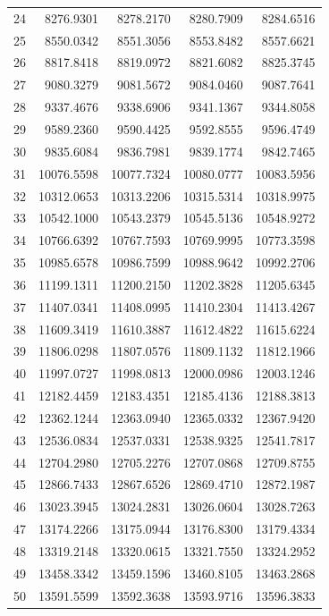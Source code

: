 \documentclass[11pt]{article}
\begin{document}
\begin{longtable}{r r r r r }
24 & 8276.9301 & 8278.2170 & 8280.7909 & 8284.6516 \\
25 & 8550.0342 & 8551.3056 & 8553.8482 & 8557.6621 \\
26 & 8817.8418 & 8819.0972 & 8821.6082 & 8825.3745 \\
27 & 9080.3279 & 9081.5672 & 9084.0460 & 9087.7641 \\
28 & 9337.4676 & 9338.6906 & 9341.1367 & 9344.8058 \\
29 & 9589.2360 & 9590.4425 & 9592.8555 & 9596.4749 \\
30 & 9835.6084 & 9836.7981 & 9839.1774 & 9842.7465 \\
31 & 10076.5598 & 10077.7324 & 10080.0777 & 10083.5956 \\
32 & 10312.0653 & 10313.2206 & 10315.5314 & 10318.9975 \\
33 & 10542.1000 & 10543.2379 & 10545.5136 & 10548.9272 \\
34 & 10766.6392 & 10767.7593 & 10769.9995 & 10773.3598 \\
35 & 10985.6578 & 10986.7599 & 10988.9642 & 10992.2706 \\
36 & 11199.1311 & 11200.2150 & 11202.3828 & 11205.6345 \\
37 & 11407.0341 & 11408.0995 & 11410.2304 & 11413.4267 \\
38 & 11609.3419 & 11610.3887 & 11612.4822 & 11615.6224 \\
39 & 11806.0298 & 11807.0576 & 11809.1132 & 11812.1966 \\
40 & 11997.0727 & 11998.0813 & 12000.0986 & 12003.1246 \\
41 & 12182.4459 & 12183.4351 & 12185.4136 & 12188.3813 \\
42 & 12362.1244 & 12363.0940 & 12365.0332 & 12367.9420 \\
43 & 12536.0834 & 12537.0331 & 12538.9325 & 12541.7817 \\
44 & 12704.2980 & 12705.2276 & 12707.0868 & 12709.8755 \\
45 & 12866.7433 & 12867.6526 & 12869.4710 & 12872.1987 \\
46 & 13023.3945 & 13024.2831 & 13026.0604 & 13028.7263 \\
47 & 13174.2266 & 13175.0944 & 13176.8300 & 13179.4334 \\
48 & 13319.2148 & 13320.0615 & 13321.7550 & 13324.2952 \\
49 & 13458.3342 & 13459.1596 & 13460.8105 & 13463.2868 \\
50 & 13591.5599 & 13592.3638 & 13593.9716 & 13596.3833 \\

\end{longtable}
\end{document}
